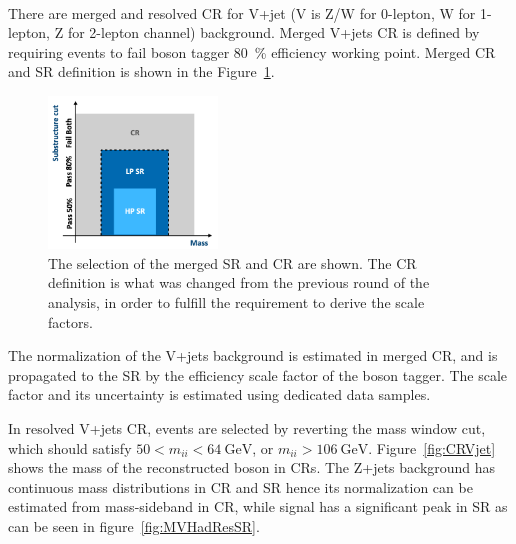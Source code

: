 \noindent\textbf{}  \\
There are merged and resolved CR for V+jet (V is Z/W for 0-lepton, W for 1-lepton, Z for 2-lepton channel) background.
Merged V+jets CR is defined by requiring events to fail boson tagger 80~\% efficiency working point. 
Merged CR and SR definition is shown in the Figure~\ref{fig:MergedRegion}.
\begin{figure}[H]
    \centering
    \includegraphics[width=0.4\textwidth]{figures/MergedRegion}
    \caption{The selection of the merged SR and CR are shown. The CR definition is what was changed from the previous round of the analysis, in order to fulfill the requirement to derive the scale factors.}
    \label{fig:MergedRegion}
\end{figure}
The normalization of the V+jets background is estimated in merged CR, and is propagated to the SR by the efficiency scale factor of the boson tagger.
The scale factor and its uncertainty is estimated using dedicated data samples. 

In resolved V+jets CR, events are selected by reverting the mass window cut, which should satisfy $50<m_{i i}<64 ~\mathrm{GeV}$, or $m_{i i}>106 ~\mathrm{GeV}$. 
Figure~\ref{fig:CRVjet} shows the mass of the reconstructed boson in CRs. The Z+jets background has continuous mass distributions in CR and SR hence its normalization can be estimated from mass-sideband in CR, while signal has a significant peak in SR as can be seen in figure~\ref{fig:MVHadResSR}.

